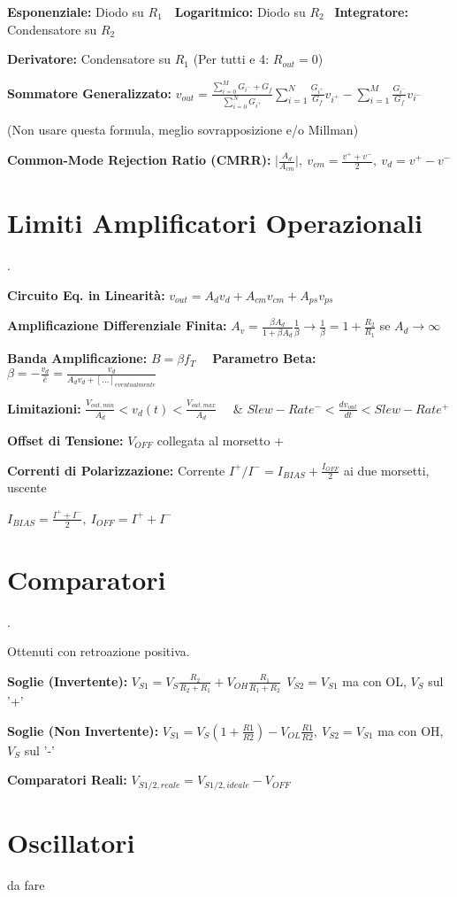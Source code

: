 \documentclass[12pt]{extarticle}
\begin{document}
{\bf Esponenziale:} Diodo su $R_1$\ \ {\bf Logaritmico:} Diodo su $R_2$ \ {\bf Integratore:} Condensatore su $R_2$

{\bf Derivatore:} Condensatore su $R_1$ (Per tutti e 4: $R_{out} = 0$)


{\bf Sommatore Generalizzato:} $\displaystyle v_{out} = \frac{\sum_{i=0}^M G_{i^-} + G_f}{\sum_{i=0}^N G_{i^+}} \sum_{i=1}^N \frac{G_{i^+}}{G_f}v_{i^+}-\sum_{i=1}^M\frac{G_{i^-}}{G_f}v_{i^-}$ 

(Non usare questa formula, meglio sovrapposizione e/o Millman)

{\bf Common-Mode Rejection Ratio (CMRR):} $\displaystyle \bigg |\frac{A_d}{A_{cm}} \bigg |, \ v_{cm} = \frac{v^++v^-}{2}, \ v_d = v^+-v^-$


\section{Limiti Amplificatori Operazionali}.

{\bf Circuito Eq. in Linearità:} $\displaystyle v_{out} = A_dv_d +A_{cm}v_{cm}+A_{ps}v_{ps}$

{\bf Amplificazione Differenziale Finita:} $\displaystyle A_v = \frac{\beta A_d}{1+\beta A_d}\frac{1}{\beta} \to \frac{1}{\beta} = 1+\frac{R_2}{R_1}$ se $A_d \to \infty$

{\bf Banda Amplificazione:} $\displaystyle B = \beta f_T$ \ \ {\bf Parametro Beta:} $\displaystyle \beta = -\frac{v_d}{\hat{e}} = \frac{v_d}{A_dv_d + [...]_{eventualmente}}$

{\bf Limitazioni:} $\displaystyle \frac{V_{out, min}}{A_d} < v_d(t) < \frac{V_{out, max}}{A_d}$ \ \ \&  $\displaystyle Slew-Rate^- < \frac{dv_{out}}{dt} < Slew-Rate^+$

{\bf Offset di Tensione:} $V_{OFF}$ collegata al morsetto +

{\bf Correnti di Polarizzazione:} Corrente $I^+/I^- = I_{BIAS}+\frac{I_{OFF}}{2}$ ai due morsetti, uscente

$\displaystyle I_{BIAS} = \frac{I^++I^-}{2}, \ I_{OFF} = I^++I^-$

\section{Comparatori}.

Ottenuti con retroazione positiva.

{\bf Soglie (Invertente):} $\displaystyle V_{S1} = V_S\frac{R_2}{R_2+R_1}+V_{OH}\frac{R_1}{R_1+R_2} \ \ V_{S2} = V_{S1} $ ma con OL, $V_S$ sul '+'

{\bf Soglie (Non Invertente):} $\displaystyle V_{S1} = V_S(1+\frac{R1}{R2}) - V_{OL}\frac{R1}{R2}, \ V_{S2} = V_{S1}$ ma con OH, $V_S$ sul '-'

{\bf Comparatori Reali:} $\displaystyle V_{S1/2, reale} = V_{S1/2, ideale}-V_{OFF}$

\section{Oscillatori}

da fare
\end{document}
